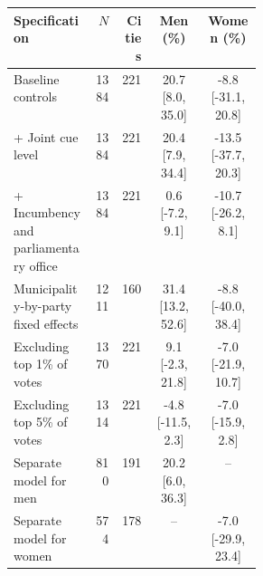 \begin{tabular}{p{0.32\linewidth}rrcc}
\toprule
Specification & $N$ & Cities & Men (\%) & Women (\%) \\
\midrule
Baseline controls & 1384 & 221 & 20.7 [8.0, 35.0] & -8.8 [-31.1, 20.8] \\
+ Joint cue level & 1384 & 221 & 20.4 [7.9, 34.4] & -13.5 [-37.7, 20.3] \\
+ Incumbency and parliamentary office & 1384 & 221 & 0.6 [-7.2, 9.1] & -10.7 [-26.2, 8.1] \\
Municipality-by-party fixed effects & 1211 & 160 & 31.4 [13.2, 52.6] & -8.8 [-40.0, 38.4] \\
Excluding top 1\% of votes & 1370 & 221 & 9.1 [-2.3, 21.8] & -7.0 [-21.9, 10.7] \\
Excluding top 5\% of votes & 1314 & 221 & -4.8 [-11.5, 2.3] & -7.0 [-15.9, 2.8] \\
Separate model for men & 810 & 191 & 20.2 [6.0, 36.3] & -- \\
Separate model for women & 574 & 178 & -- & -7.0 [-29.9, 23.4] \\
\bottomrule
\end{tabular}
